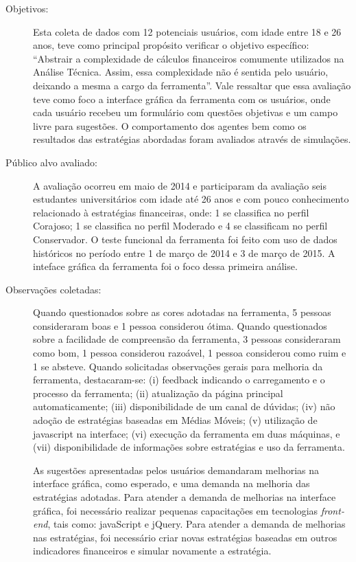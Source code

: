 \begin{description}

\item[Objetivos:]
Esta coleta de dados com 12 potenciais usuários, com idade entre 18 e 26 anos, teve como principal propósito verificar o objetivo específico: “Abstrair a complexidade de cálculos financeiros comumente utilizados na Análise Técnica. Assim, essa complexidade não é sentida pelo usuário, deixando a mesma a cargo da ferramenta”. Vale ressaltar que essa avaliação teve como foco a interface gráfica da ferramenta com os usuários, onde cada usuário recebeu um formulário com questões objetivas e um campo livre para sugestões. O comportamento dos agentes bem como os resultados das estratégias abordadas foram avaliados através de simulações.

\item[Público alvo avaliado:]

A avaliação ocorreu em maio de 2014 e participaram da avaliação seis estudantes universitários com idade até 26 anos e com pouco conhecimento relacionado à estratégias financeiras, onde: 1 se classifica no perfil Corajoso; 1 se classifica no perfil Moderado e 4 se classificam no perfil Conservador. O teste funcional da ferramenta foi feito com uso de dados históricos no período entre 1 de março de 2014 e 3 de março de 2015. A inteface gráfica da ferramenta foi o foco dessa primeira análise.

\item[Observações coletadas:]
Quando questionados sobre as cores adotadas na ferramenta, 5 pessoas consideraram boas e 1 pessoa considerou ótima. Quando questionados sobre a facilidade de compreensão da ferramenta, 3 pessoas consideraram como bom, 1 pessoa considerou razoável, 1 pessoa considerou como ruim e 1 se absteve. Quando solicitadas observações gerais para melhoria da ferramenta, destacaram-se: (i) feedback indicando o carregamento e o processo da ferramenta; (ii) atualização da página principal automaticamente; (iii) disponibilidade de um canal de dúvidas; (iv) não adoção de estratégias baseadas em Médias Móveis; (v) utilização de javascript na interface; (vi) execução da ferramenta em duas máquinas, e (vii) disponibilidade de informações sobre estratégias e uso da ferramenta.

As sugestões apresentadas pelos usuários demandaram melhorias na interface gráfica, como esperado, e uma demanda na melhoria das estratégias adotadas. Para atender a demanda de melhorias na interface gráfica, foi necessário realizar pequenas capacitações em tecnologias \textit{front-end}, tais como: javaScript e jQuery. Para atender a demanda de melhorias nas estratégias, foi necessário criar novas estratégias baseadas em outros indicadores financeiros e simular novamente a estratégia.


\end{description}
